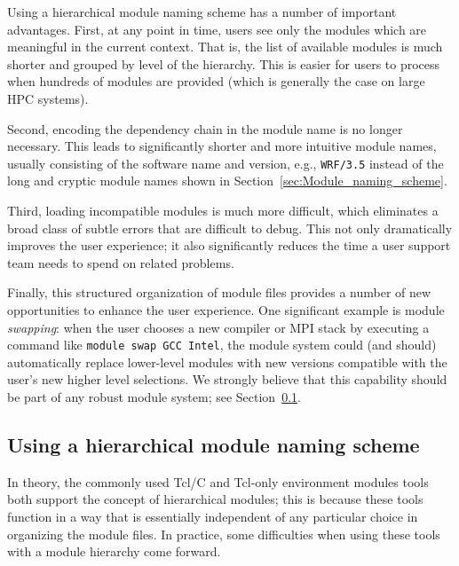 
Using a hierarchical module naming scheme has a number of important
advantages. First, at any point in time, users see only the
modules which are meaningful in the current context. That is, the list of
available modules is much shorter and grouped by level of the hierarchy. This is easier for users to process when hundreds of modules are
provided (which is generally the case on large HPC systems).

Second, encoding the dependency chain in the module name is no longer
necessary. This leads to significantly shorter and more intuitive
module names, usually consisting of the software name and version, e.g.,
\texttt{\small WRF/3.5} instead of the long and cryptic module names shown in
Section~\ref{sec:Module_naming_scheme}.

Third, loading incompatible modules is much more difficult,
which eliminates a broad class of subtle errors that
are difficult to debug. This not only dramatically improves the user experience; it
also significantly reduces the time a user support team needs to spend on related
problems.

Finally, this structured organization of module files provides
a number of new opportunities to enhance the user experience. One significant
example is module \emph{swapping}: when the user chooses a new compiler or MPI
stack by executing a command like \texttt{\small module swap GCC Intel}, the module
system could (and should) automatically replace lower-level modules with new
versions compatible with the user's new higher level selections. We strongly believe
that this capability should be part of any robust module system; see
Section~\ref{sec:using_a_hierarchy}.


\subsection{Using a hierarchical module naming scheme}
\label{sec:using_a_hierarchy}

In theory, the commonly used Tcl/C and Tcl-only environment modules tools
both support the concept of hierarchical modules; this is because these tools
function in a way that is essentially independent of any particular choice in
organizing the module files. In practice, some difficulties when using these tools
with a module hierarchy come forward.

